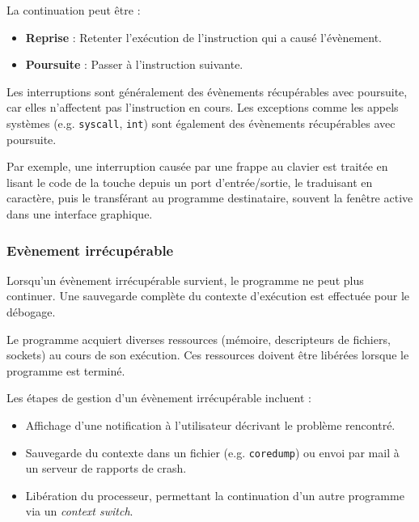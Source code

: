 
La continuation peut être :
\begin{itemize}
    \item \textbf{Reprise} : Retenter l'exécution de l'instruction qui a causé l'évènement.
    \item \textbf{Poursuite} : Passer à l'instruction suivante.
\end{itemize}

Les interruptions sont généralement des évènements récupérables avec poursuite, car elles n'affectent pas l'instruction en cours. Les exceptions comme les appels systèmes (e.g. \texttt{syscall}, \texttt{int}) sont également des évènements récupérables avec poursuite.

Par exemple, une interruption causée par une frappe au clavier est traitée en lisant le code de la touche depuis un port d'entrée/sortie, le traduisant en caractère, puis le transférant au programme destinataire, souvent la fenêtre active dans une interface graphique.

\subsubsection{Evènement irrécupérable}

Lorsqu'un évènement irrécupérable survient, le programme ne peut plus continuer. Une sauvegarde complète du contexte d'exécution est effectuée pour le débogage.

Le programme acquiert diverses ressources (mémoire, descripteurs de fichiers, sockets) au cours de son exécution. Ces ressources doivent être libérées lorsque le programme est terminé.

Les étapes de gestion d'un évènement irrécupérable incluent :
\begin{itemize}
    \item Affichage d'une notification à l'utilisateur décrivant le problème rencontré.
    \item Sauvegarde du contexte dans un fichier (e.g. \texttt{coredump}) ou envoi par mail à un serveur de rapports de crash.
    \item Libération du processeur, permettant la continuation d'un autre programme via un \textit{context switch}.
\end{itemize}


